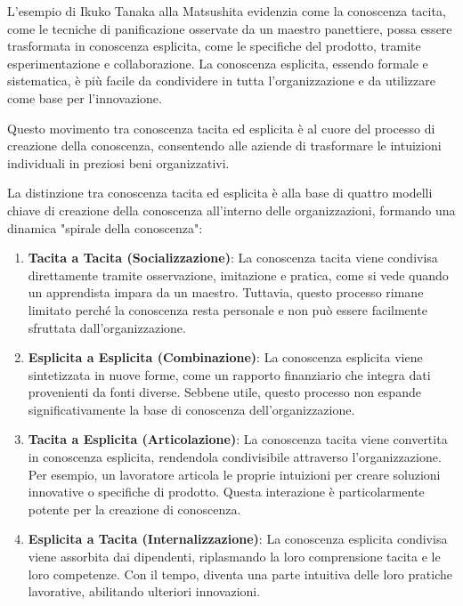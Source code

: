 \documentclass{article}
\begin{document}
L'esempio di Ikuko Tanaka alla Matsushita evidenzia come la conoscenza tacita, come le tecniche di panificazione osservate da un maestro panettiere, possa essere trasformata in conoscenza esplicita, come le specifiche del prodotto, tramite esperimentazione e collaborazione. La conoscenza esplicita, essendo formale e sistematica, è più facile da condividere in tutta l'organizzazione e da utilizzare come base per l'innovazione.

Questo movimento tra conoscenza tacita ed esplicita è al cuore del processo di creazione della conoscenza, consentendo alle aziende di trasformare le intuizioni individuali in preziosi beni organizzativi.

La distinzione tra conoscenza tacita ed esplicita è alla base di quattro modelli chiave di creazione della conoscenza all'interno delle organizzazioni, formando una dinamica "spirale della conoscenza":

\begin{enumerate}
    \item \textbf{Tacita a Tacita (Socializzazione)}: La conoscenza tacita viene condivisa direttamente tramite osservazione, imitazione e pratica, come si vede quando un apprendista impara da un maestro. Tuttavia, questo processo rimane limitato perché la conoscenza resta personale e non può essere facilmente sfruttata dall'organizzazione.
    
    \item \textbf{Esplicita a Esplicita (Combinazione)}: La conoscenza esplicita viene sintetizzata in nuove forme, come un rapporto finanziario che integra dati provenienti da fonti diverse. Sebbene utile, questo processo non espande significativamente la base di conoscenza dell'organizzazione.
    
    \item \textbf{Tacita a Esplicita (Articolazione)}: La conoscenza tacita viene convertita in conoscenza esplicita, rendendola condivisibile attraverso l'organizzazione. Per esempio, un lavoratore articola le proprie intuizioni per creare soluzioni innovative o specifiche di prodotto. Questa interazione è particolarmente potente per la creazione di conoscenza.
    
    \item \textbf{Esplicita a Tacita (Internalizzazione)}: La conoscenza esplicita condivisa viene assorbita dai dipendenti, riplasmando la loro comprensione tacita e le loro competenze. Con il tempo, diventa una parte intuitiva delle loro pratiche lavorative, abilitando ulteriori innovazioni.
\end{enumerate}
\end{document}
